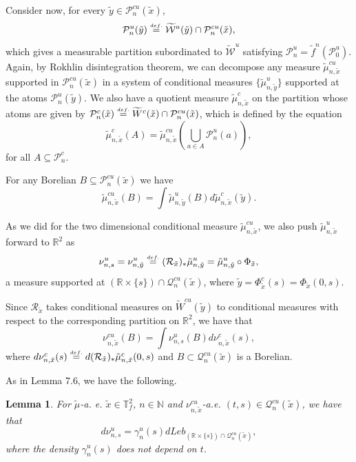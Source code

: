 \documentclass[a4paper,11pt,reqno]{amsart}
\def\tW{\widetilde W}
\newcommand{\R}{{\mathbb R}}
\newcommand{\N}{{\mathbb N}}
\newcommand{\TTf}{{\mathbb{T}_f^2}}
\newcommand{\cP}{{\mathcal P}}
\newcommand{\cW}{{\mathcal W}}
\newcommand{\eqdef}{\stackrel{\scriptscriptstyle\textrm def.}{=}}
\newcommand{\tix}{\tilde{x}}
\newcommand{\w}{\widetilde{\cW}}
\newtheorem{lemma}[theorem]{Lemma}
\theoremstyle{definition}
\begin{document}
Consider now, for every $\tilde{y} \in \mathcal{P}^{cu}_n(\tix)$, 
$$\mathcal{P}^u_n(\tilde{y}) \eqdef \w^u(\tilde{y}) \cap \mathcal{P}^{cu}_n(\tix),$$
which gives a measurable partition subordinated to $\w^u$ satisfying $\mathcal{P}^{u}_n = \tilde{f}^n(\mathcal{P}^{u}_0)$. Again, by Rokhlin disintegration theorem, we can decompose any measure $\tilde{\mu}^{cu}_{n, \tix}$ supported in $\mathcal{P}^{cu}_n(\tix)$ in a system of conditional measures $\{ \tilde{\mu}^{u}_{n, \tilde{y}} \}$ supported at the atoms $\mathcal{P}^{u}_n(\tilde{y})$. We also have a quotient measure $\tilde{\mu}^{c}_{n, \tilde{x}}$ on the partition whose atoms are given by $\cP^c_n(\tix)\eqdef \tW^c(\tix)\cap\cP^{cu}_n(\tix)$, which is defined by the equation $$\tilde{\mu}^{c}_{n, \tilde{x}}(A) = \tilde{\mu}^{cu}_{n, \tilde{x}}\left(\bigcup\limits_{a \in A} \cP^u_n(a)\right),$$ for all $A \subseteq \mathcal{P}^{c}_n.$

For any Borelian $B \subseteq \mathcal{P}^{cu}_n(\tix)$ we have
$$\tilde{\mu}^{cu}_{n, \tilde{x}}(B) = \int \tilde{\mu}^{u}_{n, \tilde{y}}(B) d\tilde{\mu}^{c}_{n, \tilde{x}}(\tilde{y}).$$

As we did for the two dimensional conditional measure $\tilde{\mu}^{cu}_{n, \tilde{x}}$, we also push $\tilde{\mu}^{u}_{n, \tilde{x}}$ forward to $\R^2$ as
$$\nu^{u}_{n, s} = \nu^{u}_{n, \tilde{y}} \eqdef (\mathcal{R}_{\tilde{x}})_*\tilde{\mu}^{u}_{n, \tilde{y}} = \tilde{\mu}^{u}_{n, \tilde{y}} \circ \Phi_{\tix},$$
a measure supported at $(\R \times \{s\}) \cap \mathcal{Q}^{cu}_n(\tix)$, where $\tilde{y} = \Phi^c_{\tix}(s) = \Phi_{\tix}(0, s)$.

Since $\mathcal{R}_{\tilde{x}}$ takes conditional measures on $\tW^{cu}(\tilde{y})$ to conditional measures with respect to the corresponding partition on $\R^2$, we have that
$$\nu^{cu}_{n, \tilde{x}}(B) = \int \nu^{u}_{n, s}(B) d\nu^{c}_{n, \tilde{x}}(s),$$
where $d\nu^{c}_{n, \tilde{x}}(s) \eqdef d(\mathcal{R}_{\tilde{x}})_*\tilde{\mu}^{c}_{n, \tilde{x}}(0,s)$ and $B \subset \mathcal{Q}^{cu}_n(\tix)$ is a Borelian.


As in \cite{ALOS} Lemma 7.6, we have the following.

\begin{lemma}
    \label{lem:nu-horiz-eh-leb}
    For $\tilde{\mu}$-a. e. $\tilde{x} \in \TTf$, $n \in \N$ and $\nu^{cu}_{n, \tilde{x}}$-a.e. $(t,s) \in \mathcal{Q}^{cu}_n({\tix})$, we have that
    $$d\nu^{u}_{n, s} = \gamma^u_n(s) dLeb_{(\R \times \{s\}) \cap \mathcal{Q}^{cu}_n(\tix)},$$
    where the density $\gamma^u_n(s)$ does not depend on $t$.
\end{lemma}    
\end{document}
